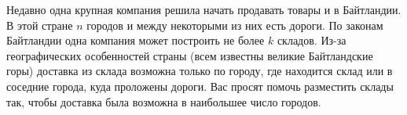 Недавно одна крупная компания решила начать продавать товары и в Байтландии. В этой стране $n$ городов и между некоторыми из них есть дороги. По законам Байтландии одна компания может построить не более $k$ складов. Из-за географических особенностей страны (всем известны великие Байтландские горы) доставка из склада возможна только по городу, где находится склад или в соседние города, куда проложены дороги. 
Вас просят помочь разместить склады так, чтобы доставка была возможна в наибольшее число городов.